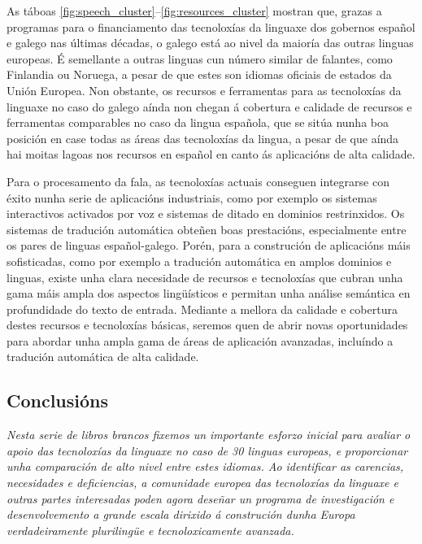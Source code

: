 \begin{multicols}{2}
As táboas \ref{fig:speech_cluster}--\ref{fig:resources_cluster} mostran que, grazas a programas para o financiamento das tecnoloxías da linguaxe dos gobernos español e galego nas últimas décadas, o galego está ao nivel da maioría das outras linguas europeas. É semellante a outras linguas cun número similar de falantes, como Finlandia ou Noruega, a pesar de que estes son idiomas oficiais de estados da Unión Europea. Non obstante, os recursos e ferramentas para as tecnoloxías da linguaxe no caso do galego aínda non chegan á cobertura e calidade de recursos e ferramentas comparables no caso da lingua española, que se sitúa nunha boa posición en case todas as áreas das tecnoloxías da lingua, a pesar de que aínda hai moitas lagoas nos recursos en español en canto ás aplicacións de alta calidade.

Para o procesamento da fala, as tecnoloxías actuais conseguen integrarse con éxito nunha serie de aplicacións industriais, como por exemplo os sistemas interactivos activados por voz e sistemas de ditado en dominios restrinxidos. Os sistemas de tradución automática obteñen boas prestacións, especialmente entre os pares de linguas español-galego. Porén, para a construción de aplicacións máis sofisticadas, como por exemplo a tradución automática en amplos dominios e linguas, existe unha clara necesidade de recursos e tecnoloxías que cubran unha gama máis ampla dos aspectos lingüísticos e permitan unha análise semántica en profundidade do texto de entrada. Mediante a mellora da calidade e cobertura destes recursos e tecnoloxías básicas, seremos quen de abrir novas oportunidades para abordar unha ampla gama de áreas de aplicación avanzadas, incluíndo a tradución automática de alta calidade.

\subsection{Conclusións}

\emph{Nesta serie de libros brancos fixemos un importante esforzo inicial para avaliar o apoio das tecnoloxías da linguaxe no caso de 30 linguas europeas, e proporcionar unha comparación de alto nivel entre estes idiomas. Ao identificar as carencias, necesidades e deficiencias, a comunidade europea das tecnoloxías da linguaxe e outras partes interesadas poden agora deseñar un programa de investigación e desenvolvemento a grande escala dirixido á construción dunha Europa verdadeiramente plurilingüe e tecnoloxicamente avanzada.}


\end{multicols}
